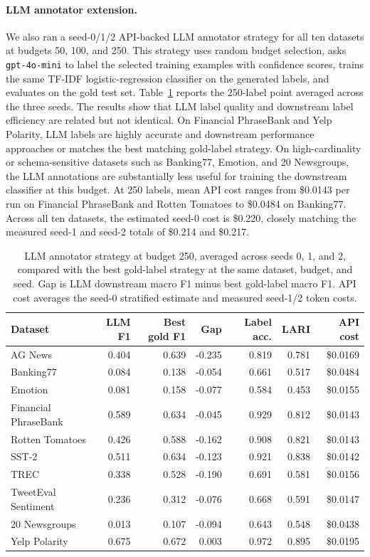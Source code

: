 \documentclass[11pt]{article}
\begin{document}
\paragraph{LLM annotator extension.}
We also ran a seed-0/1/2 API-backed LLM annotator strategy for all ten datasets at budgets 50, 100, and 250. This strategy uses random budget selection, asks \texttt{gpt-4o-mini} to label the selected training examples with confidence scores, trains the same TF-IDF logistic-regression classifier on the generated labels, and evaluates on the gold test set. Table~\ref{tab:llm-annotator-250} reports the 250-label point averaged across the three seeds. The results show that LLM label quality and downstream label efficiency are related but not identical. On Financial PhraseBank and Yelp Polarity, LLM labels are highly accurate and downstream performance approaches or matches the best matching gold-label strategy. On high-cardinality or schema-sensitive datasets such as Banking77, Emotion, and 20 Newsgroups, the LLM annotations are substantially less useful for training the downstream classifier at this budget. At 250 labels, mean API cost ranges from \$0.0143 per run on Financial PhraseBank and Rotten Tomatoes to \$0.0484 on Banking77. Across all ten datasets, the estimated seed-0 cost is \$0.220, closely matching the measured seed-1 and seed-2 totals of \$0.214 and \$0.217.

\begin{table}[H]
\centering
\caption{LLM annotator strategy at budget 250, averaged across seeds 0, 1, and 2, compared with the best gold-label strategy at the same dataset, budget, and seed. Gap is LLM downstream macro F1 minus best gold-label macro F1. API cost averages the seed-0 stratified estimate and measured seed-1/2 token costs.}
\label{tab:llm-annotator-250}
\scriptsize
\begin{tabular}{lrrrrrr}
\toprule
Dataset & LLM F1 & Best gold F1 & Gap & Label acc. & LARI & API cost \\
\midrule
AG News & 0.404 & 0.639 & -0.235 & 0.819 & 0.781 & \$0.0169 \\
Banking77 & 0.084 & 0.138 & -0.054 & 0.661 & 0.517 & \$0.0484 \\
Emotion & 0.081 & 0.158 & -0.077 & 0.584 & 0.453 & \$0.0155 \\
Financial PhraseBank & 0.589 & 0.634 & -0.045 & 0.929 & 0.812 & \$0.0143 \\
Rotten Tomatoes & 0.426 & 0.588 & -0.162 & 0.908 & 0.821 & \$0.0143 \\
SST-2 & 0.511 & 0.634 & -0.123 & 0.921 & 0.838 & \$0.0142 \\
TREC & 0.338 & 0.528 & -0.190 & 0.691 & 0.581 & \$0.0156 \\
TweetEval Sentiment & 0.236 & 0.312 & -0.076 & 0.668 & 0.591 & \$0.0147 \\
20 Newsgroups & 0.013 & 0.107 & -0.094 & 0.643 & 0.548 & \$0.0438 \\
Yelp Polarity & 0.675 & 0.672 & 0.003 & 0.972 & 0.895 & \$0.0195 \\
\bottomrule
\end{tabular}
\end{table}
\end{document}
